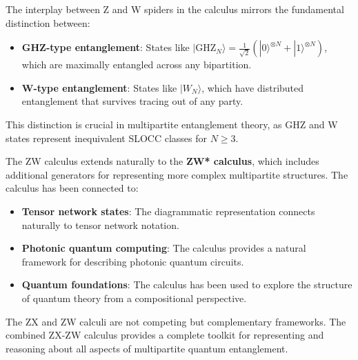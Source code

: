 \documentclass[12pt,a4paper]{article}
\begin{document}
The interplay between Z and W spiders in the calculus mirrors the fundamental distinction between:
\begin{itemize}
	\item \textbf{GHZ-type entanglement}: States like $|\text{GHZ}_N\rangle = \frac{1}{\sqrt{2}}(|0\rangle^{\otimes N} + |1\rangle^{\otimes N})$, which are maximally entangled across any bipartition.
	\item \textbf{W-type entanglement}: States like $|W_N\rangle$, which have distributed entanglement that survives tracing out of any party.
\end{itemize}

This distinction is crucial in multipartite entanglement theory, as GHZ and W states represent inequivalent SLOCC classes for $N \geq 3$.

The ZW calculus extends naturally to the \textbf{ZW* calculus}, which includes additional generators for representing more complex multipartite structures. The calculus has been connected to:
\begin{itemize}
	\item \textbf{Tensor network states}: The diagrammatic representation connects naturally to tensor network notation.
	\item \textbf{Photonic quantum computing}: The calculus provides a natural framework for describing photonic quantum circuits.
	\item \textbf{Quantum foundations}: The calculus has been used to explore the structure of quantum theory from a compositional perspective.
\end{itemize}

The ZX and ZW calculi are not competing but complementary frameworks. The combined ZX-ZW calculus provides a complete toolkit for representing and reasoning about all aspects of multipartite quantum entanglement.
\end{document}
